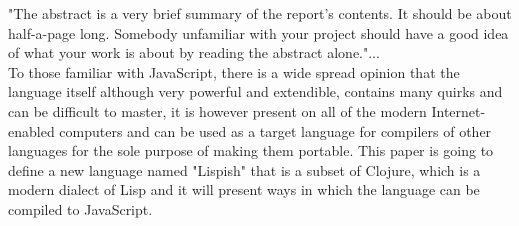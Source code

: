 "The abstract is a very brief summary of the report's contents. It should be about half-a-page long. Somebody unfamiliar with your project should have a good idea of what your work is about by reading the abstract alone."... \\

To those familiar with JavaScript, there is a wide spread opinion that the language itself although very powerful and extendible, contains many quirks and can be difficult to master, it is however present on all of the modern Internet-enabled computers and can be used as a target language for compilers of other languages for the sole purpose of making them portable. 
This paper is going to define a new language named "Lispish" that is a subset of Clojure, which is a modern dialect of Lisp and it will present ways in which the language can be compiled to JavaScript. 